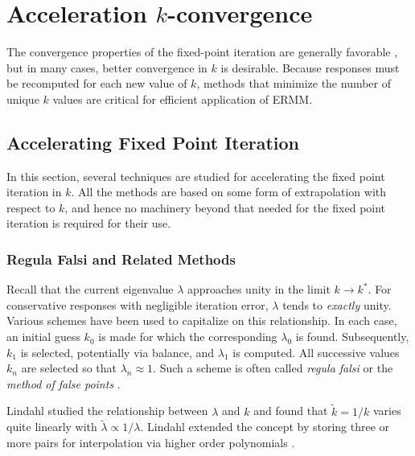 \section{Acceleration $k$-convergence}
\label{sec:outer}

The convergence properties of the fixed-point iteration
are generally favorable \cite{roberts2014cer}, but in many cases,
better convergence in $k$ is desirable.  Because responses 
must be recomputed for each new value of $k$,  methods that 
minimize the number of unique $k$ values are critical for 
efficient application of ERMM.

\subsection{Accelerating Fixed Point Iteration}

In this section, several techniques are studied for 
accelerating the fixed point iteration in $k$.  All 
the methods are based on some form of extrapolation with respect to 
$k$, and hence no machinery beyond that needed for the 
fixed point iteration is required for their use.

\subsubsection{Regula Falsi and Related Methods}
\label{sec:extrapolationmethods}

Recall that the current eigenvalue $\lambda$ approaches unity in the 
limit $k\to k^*$.  For conservative responses with negligible 
iteration error, $\lambda$ tends to {\it exactly} unity.  Various 
schemes have been used to capitalize on this relationship.  In each 
case, an initial guess $k_0$ is made for which the corresponding 
$\lambda_0$ is found.  Subsequently, $k_1$ is selected, potentially via 
balance, and $\lambda_1$ is computed.  All successive values $k_n$  
are selected so that $\lambda_n \approx 1$.  Such a scheme is often
called {\it regula falsi} or the {\it method of false points} 
\cite{lindahl1976mdr}.

Lindahl studied the relationship between $\lambda$ and $k$ and found that 
$\tilde{k} = 1/k$ varies quite 
linearly with $\tilde{\lambda} \propto 1/\lambda$.
Lindahl extended the concept by storing three or more pairs for interpolation
via higher order polynomials \cite{lindahl1976mdr}.

